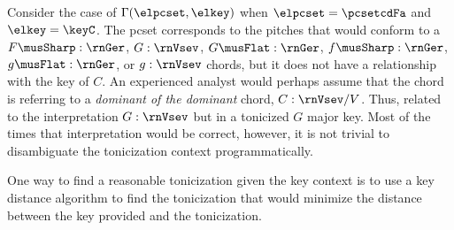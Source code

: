 
Consider the case of $\Gamma(\elpcset, \elkey)$ when
$\elpcset = \pcsetcdFa$ and $\elkey = \keyC$. The
\gls{pcset} corresponds to the pitches that would conform to
a $F\musSharp:\rnGer$, $G:\rnVsev$, $G\musFlat:\rnGer$,
$f\musSharp:\rnGer$, $g\musFlat:\rnGer$, or $g:\rnVsev$
chords, but it does not have a relationship with the key of
$C$. An experienced analyst would perhaps assume that the
chord is referring to a \emph{dominant of the dominant}
chord, $C:\rnVsev/V$. Thus, related to the interpretation
$G:\rnVsev$ but in a tonicized $G$ major key. Most of the
times that interpretation would be correct, however, it is
not trivial to disambiguate the tonicization context
programmatically.

One way to find a reasonable tonicization given the key
context is to use a key distance algorithm to find the
tonicization that would minimize the distance between the
key provided and the tonicization.
